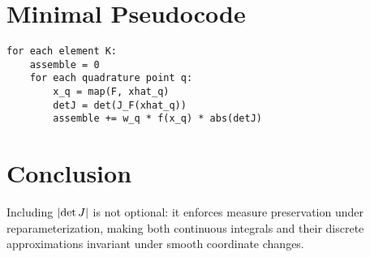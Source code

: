 \documentclass[11pt]{article}
\begin{document}
\section{Minimal Pseudocode}
\begin{verbatim}
for each element K:
    assemble = 0
    for each quadrature point q:
        x_q = map(F, xhat_q)
        detJ = det(J_F(xhat_q))
        assemble += w_q * f(x_q) * abs(detJ)
\end{verbatim}

\section{Conclusion}
Including \(\abs{\det J}\) is not optional: it enforces measure preservation under reparameterization, making both continuous integrals and their discrete approximations invariant under smooth coordinate changes.
\end{document}
